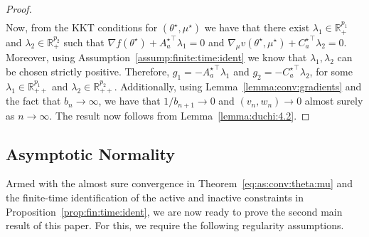 \documentclass[11pt,a4paper]{article}
\theoremstyle{definition}
\begin{document}
\begin{proof}
\begin{align*}
\end{align*}
Now, from the KKT conditions for $(\theta^\star,\mu^\star)$ we have that there exist $\lambda_1 \in \mathbb R_{+}^{p_1}$ and $\lambda_2 \in \mathbb R_{+}^{p_2}$ such that $\nabla {f}(\theta^\star) + {A_a^\star}^\top \lambda_1 = 0$ and $\nabla_\mu v(\theta^\star,\mu^\star) + {C_a^\star}^\top \lambda_2 = 0$. Moreover, using Assumption~\ref{assump:finite:time:ident} we know that $\lambda_1, \lambda_2$ can be chosen strictly positive. Therefore, $g_1 = -{A_a^\star}^\top \lambda_1$ and $g_2 = - {C_a^\star}^\top \lambda_2$, for some $\lambda_1 \in \mathbb R_{++}^{p_1}$ and $\lambda_2 \in \mathbb R_{++}^{p_2}$. Additionally, using Lemma~\ref{lemma:conv:gradients} and the fact that $b_{n} \to \infty$, we have that $1/b_{n+1} \to 0$ and $(v_n,w_n) \to 0$ almost surely as $n \to \infty$. The result now follows from Lemma~\ref{lemma:duchi:4.2}.
\end{proof}










\subsection{Asymptotic Normality}

Armed with the almost sure convergence in Theorem~\ref{eq:as:conv:theta:mu} and the finite-time identification of the active and inactive constraints in Proposition~\ref{prop:fin:time:ident}, we are now ready to prove the second main result of this paper. For this, we require the following regularity assumptions.
\end{document}
